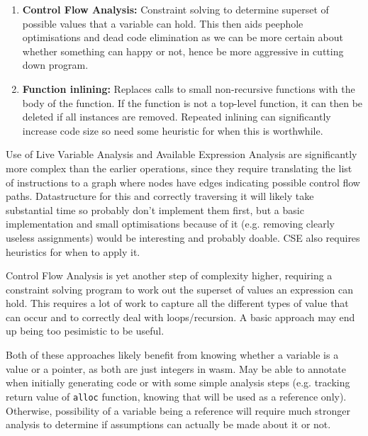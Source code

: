 \documentclass[10pt,twoside,a4paper]{article}
\begin{document}
\begin{enumerate}
\item \textbf{Control Flow Analysis: } Constraint solving to determine superset of possible values that a variable can hold. This then aids peephole optimisations and dead code elimination as we can be more certain about whether something can happy or not, hence be more aggressive in cutting down program.

\item \textbf{Function inlining: } Replaces calls to small non-recursive functions with the body of the function. If the function is not a top-level function, it can then be deleted if all instances are removed. Repeated inlining can significantly increase code size so need some heuristic for when this is worthwhile.
\end{enumerate}

Use of Live Variable Analysis and Available Expression Analysis are significantly more complex than the earlier operations, since they require translating the list of instructions to a graph where nodes have edges indicating possible control flow paths. Datastructure for this and correctly traversing it will likely take substantial time so probably don't implement them first, but a basic implementation and small optimisations because of it (e.g. removing clearly useless assignments) would be interesting and probably doable. CSE also requires heuristics for when to apply it.

Control Flow Analysis is yet another step of complexity higher, requiring a constraint solving program to work out the superset of values an expression can hold. This requires a lot of work to capture all the different types of value that can occur and to correctly deal with loops/recursion. A basic approach may end up being too pesimistic to be useful.

Both of these approaches likely benefit from knowing whether a variable is a value or a pointer, as both are just integers in wasm. May be able to annotate when initially generating code or with some simple analysis steps (e.g. tracking return value of \verb|alloc| function, knowing that will be used as a reference only). Otherwise, possibility of a variable being a reference will require much stronger analysis to determine if assumptions can actually be made about it or not.
\end{document}
